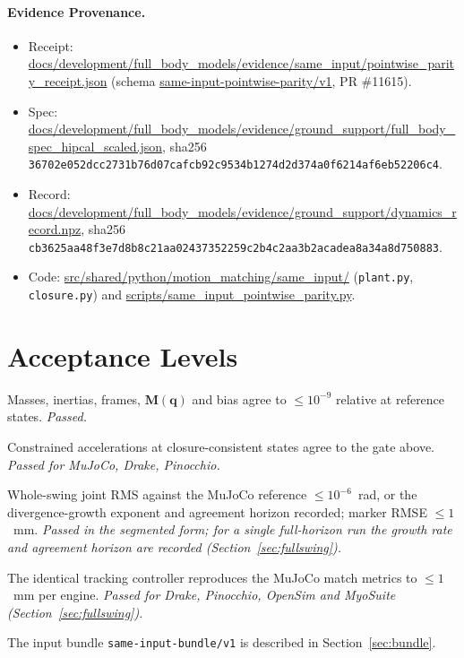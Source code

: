 \documentclass[11pt,a4paper]{article}
\newcommand{\bM}{\mathbf{M}}
\newcommand{\bq}{\mathbf{q}}
\begin{document}
\paragraph{Evidence Provenance.}
\begin{itemize}[nosep]
\item Receipt: \url{docs/development/full_body_models/evidence/same_input/pointwise_parity_receipt.json}
  (schema \url{same-input-pointwise-parity/v1}, PR \#11615).
\item Spec: \url{docs/development/full_body_models/evidence/ground_support/full_body_spec_hipcal_scaled.json},
  sha256 \\\texttt{36702e052dcc2731b76d07cafcb92c9534b1274d2d374a0f6214af6eb52206c4}.
\item Record: \url{docs/development/full_body_models/evidence/ground_support/dynamics_record.npz},
  sha256 \\\texttt{cb3625aa48f3e7d8b8c21aa02437352259c2b4c2aa3b2acadea8a34a8d750883}.
\item Code: \url{src/shared/python/motion_matching/same_input/}
  (\texttt{plant.py}, \texttt{closure.py}) and
  \url{scripts/same_input_pointwise_parity.py}.
\end{itemize}

\section{Acceptance Levels}
\begin{description}[nosep]
\item[L0, model identity.] Masses, inertias, frames, $\bM(\bq)$ and bias agree to
  $\le10^{-9}$ relative at reference states.  \emph{Passed.}
\item[L1, pointwise dynamics.] Constrained accelerations at closure-consistent
  states agree to the gate above.  \emph{Passed for MuJoCo, Drake, Pinocchio.}
\item[L2, open-loop same-input trajectory.] Whole-swing joint RMS against the
  MuJoCo reference $\le10^{-6}$~rad, or the divergence-growth exponent and
  agreement horizon recorded; marker RMSE $\le1$~mm.  \emph{Passed in the segmented
  form; for a single full-horizon run the growth rate and agreement horizon are
  recorded (Section~\ref{sec:fullswing}).}
\item[L3, closed-loop same controller.] The identical tracking controller
  reproduces the MuJoCo match metrics to $\le1$~mm per engine.  \emph{Passed for Drake,
  Pinocchio, OpenSim and MyoSuite (Section~\ref{sec:fullswing}).}
\end{description}
The input bundle \texttt{same-input-bundle/v1} is described in
Section~\ref{sec:bundle}.
\end{document}
